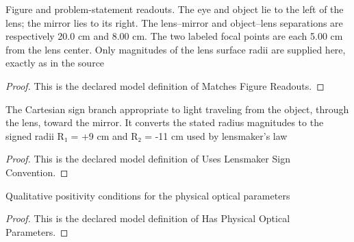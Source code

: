 \begin{definition}
  \label{def:physics:phyx-mini-0035:phyxminiproblems-problemphyxmini0035-matchesfigurereadouts}
  Figure and problem-statement readouts. The eye and object lie to the left of the lens; the mirror lies to its right. The lens--mirror and object--lens separations are respectively 20.0 cm and 8.00 cm. The two labeled focal points are each 5.00 cm from the lens center. Only magnitudes of the lens surface radii are supplied here, exactly as in the source
\end{definition}
\begin{proof}
  This is the declared model definition of Matches Figure Readouts.
\end{proof}
\begin{definition}
  \label{def:physics:phyx-mini-0035:phyxminiproblems-problemphyxmini0035-useslensmakersignconvention}
  The Cartesian sign branch appropriate to light traveling from the object, through the lens, toward the mirror. It converts the stated radius magnitudes to the signed radii R₁ = +9 cm and R₂ = -11 cm used by lensmaker's law
\end{definition}
\begin{proof}
  This is the declared model definition of Uses Lensmaker Sign Convention.
\end{proof}
\begin{definition}
  \label{def:physics:phyx-mini-0035:phyxminiproblems-problemphyxmini0035-hasphysicalopticalparameters}
  Qualitative positivity conditions for the physical optical parameters
\end{definition}
\begin{proof}
  This is the declared model definition of Has Physical Optical Parameters.
\end{proof}
